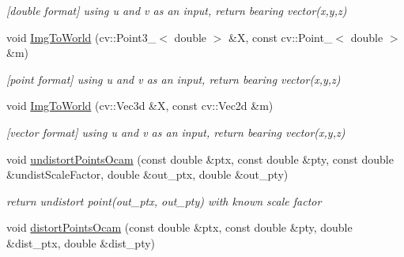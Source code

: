 \begin{DoxyCompactItemize}
\begin{DoxyCompactList}\small\item\em \mbox{[}double format\mbox{]} using u and v as an input, return bearing vector(x,y,z) \end{DoxyCompactList}\item 
void \hyperlink{classMultiColSLAM_1_1cCamModelGeneral___aa845ee27b52be3b79fa060d5ce1bfc02}{Img\+To\+World} (cv\+::\+Point3\+\_\+$<$ double $>$ \&X, const cv\+::\+Point\+\_\+$<$ double $>$ \&m)\hypertarget{classMultiColSLAM_1_1cCamModelGeneral___aa845ee27b52be3b79fa060d5ce1bfc02}{}\label{classMultiColSLAM_1_1cCamModelGeneral___aa845ee27b52be3b79fa060d5ce1bfc02}

\begin{DoxyCompactList}\small\item\em \mbox{[}point format\mbox{]} using u and v as an input, return bearing vector(x,y,z) \end{DoxyCompactList}\item 
void \hyperlink{classMultiColSLAM_1_1cCamModelGeneral___abd2ddb40da2b6c676d17353b3297d608}{Img\+To\+World} (cv\+::\+Vec3d \&X, const cv\+::\+Vec2d \&m)\hypertarget{classMultiColSLAM_1_1cCamModelGeneral___abd2ddb40da2b6c676d17353b3297d608}{}\label{classMultiColSLAM_1_1cCamModelGeneral___abd2ddb40da2b6c676d17353b3297d608}

\begin{DoxyCompactList}\small\item\em \mbox{[}vector format\mbox{]} using u and v as an input, return bearing vector(x,y,z) \end{DoxyCompactList}\item 
void \hyperlink{classMultiColSLAM_1_1cCamModelGeneral___a6ffc49b9df96a97ef05e2614da1d5cf7}{undistort\+Points\+Ocam} (const double \&ptx, const double \&pty, const double \&undist\+Scale\+Factor, double \&out\+\_\+ptx, double \&out\+\_\+pty)\hypertarget{classMultiColSLAM_1_1cCamModelGeneral___a6ffc49b9df96a97ef05e2614da1d5cf7}{}\label{classMultiColSLAM_1_1cCamModelGeneral___a6ffc49b9df96a97ef05e2614da1d5cf7}

\begin{DoxyCompactList}\small\item\em return undistort point(out\+\_\+ptx, out\+\_\+pty) with known scale factor \end{DoxyCompactList}\item 
void \hyperlink{classMultiColSLAM_1_1cCamModelGeneral___a1a259eb069f68cd26c211a155c02aef0}{distort\+Points\+Ocam} (const double \&ptx, const double \&pty, double \&dist\+\_\+ptx, double \&dist\+\_\+pty)\hypertarget{classMultiColSLAM_1_1cCamModelGeneral___a1a259eb069f68cd26c211a155c02aef0}{}\label{classMultiColSLAM_1_1cCamModelGeneral___a1a259eb069f68cd26c211a155c02aef0}


\end{DoxyCompactItemize}
